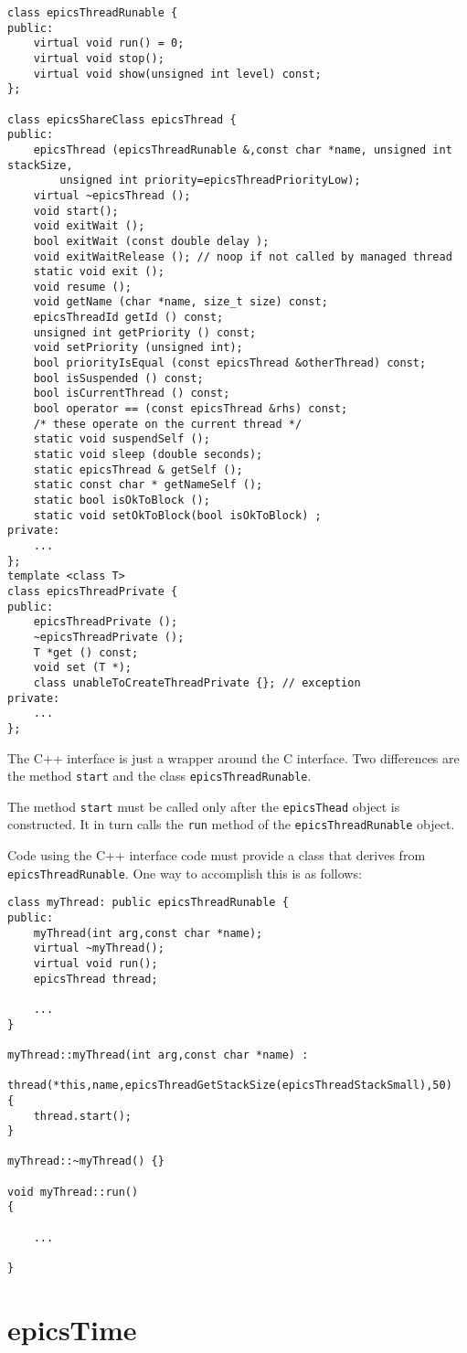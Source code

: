 \begin{verbatim}class epicsThreadRunable {
public:
    virtual void run() = 0;
    virtual void stop();
    virtual void show(unsigned int level) const;
};

class epicsShareClass epicsThread {
public:
    epicsThread (epicsThreadRunable &,const char *name, unsigned int stackSize,
        unsigned int priority=epicsThreadPriorityLow);
    virtual ~epicsThread ();
    void start();
    void exitWait ();
    bool exitWait (const double delay );
    void exitWaitRelease (); // noop if not called by managed thread
    static void exit ();
    void resume ();
    void getName (char *name, size_t size) const;
    epicsThreadId getId () const;
    unsigned int getPriority () const;
    void setPriority (unsigned int);
    bool priorityIsEqual (const epicsThread &otherThread) const;
    bool isSuspended () const;
    bool isCurrentThread () const;
    bool operator == (const epicsThread &rhs) const;
    /* these operate on the current thread */
    static void suspendSelf ();
    static void sleep (double seconds);
    static epicsThread & getSelf ();
    static const char * getNameSelf ();
    static bool isOkToBlock ();
    static void setOkToBlock(bool isOkToBlock) ;
private:
    ...
};
template <class T>
class epicsThreadPrivate {
public:
    epicsThreadPrivate ();
    ~epicsThreadPrivate ();
    T *get () const;
    void set (T *);
    class unableToCreateThreadPrivate {}; // exception
private:
    ...
};
\end{verbatim}
The C++ interface is just a wrapper around the C interface. Two differences are the method \verb|start| and the class 
\verb|epicsThreadRunable|.

The method \verb|start| must be called only after the \verb|epicsThead| object is constructed. It in turn calls the \verb|run| method of 
the \verb|epicsThreadRunable| object.

Code using the C++ interface code must provide a class that derives from \verb|epicsThreadRunable|. One way to 
accomplish this is as follows:

\begin{verbatim}class myThread: public epicsThreadRunable {
public:
    myThread(int arg,const char *name);
    virtual ~myThread();
    virtual void run();
    epicsThread thread;

    ...
}

myThread::myThread(int arg,const char *name) :
    thread(*this,name,epicsThreadGetStackSize(epicsThreadStackSmall),50)
{
    thread.start();
}

myThread::~myThread() {}

void myThread::run()
{

    ...

}
\end{verbatim}\section{epicsTime}

